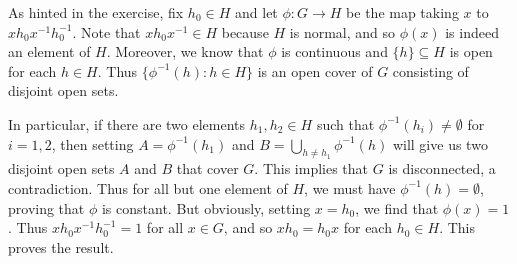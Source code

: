 \documentclass[../../solutions.tex]{subfiles}
\begin{document}
\begin{exercise} \leavevmode
As hinted in the exercise, fix $h_0\in H$ and let $\phi:G\to H$ be the map taking $x$ to $xh_0x^{-1}h_0^{-1}$. 
Note that $xh_0x^{-1}\in H$ because $H$ is normal, and so $\phi(x)$ is indeed an element of $H$. 
Moreover, we know that $\phi$ is continuous and $\{h\}\subseteq H$ is open for each $h\in H$. 
Thus $\{\phi^{-1}(h):h\in H\}$ is an open cover of $G$ consisting of disjoint open sets. 

In particular, if there are two elements $h_1,h_2\in H$ such that $\phi^{-1}(h_i)\ne\emptyset$ for $i=1,2$, then setting $A=\phi^{-1}(h_1)$ and $B=\bigcup_{h\ne h_1}\phi^{-1}(h)$ will give us two disjoint open sets $A$ and $B$ that cover $G$. 
This implies that $G$ is disconnected, a contradiction. 
Thus for all but one element of $H$, we must have $\phi^{-1}(h)=\emptyset$, proving that $\phi$ is constant. 
But obviously, setting $x=h_0$, we find that $\phi(x)=1$. 
Thus $xh_0x^{-1}h_0^{-1}=1$ for all $x\in G$, and so $xh_0=h_0x$ for each $h_0\in H$. 
This proves the result. 
\end{exercise}
\end{document}

